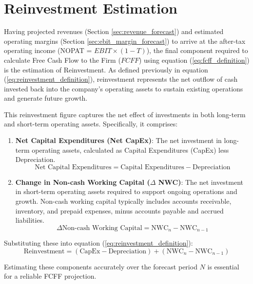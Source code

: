 \section{Reinvestment Estimation} \label{sec:reinvestment_estimation}
Having projected revenues (Section \ref{sec:revenue_forecast}) and estimated operating margins (Section \ref{sec:ebit_margin_forecast}) to arrive at the after-tax operating income (NOPAT = \(EBIT \times (1 - T)\)), the final component required to calculate Free Cash Flow to the Firm (\(FCFF\)) using equation (\ref{eq:fcff_definition}) is the estimation of Reinvestment. As defined previously in equation (\ref{eq:reinvestment_definition}), reinvestment represents the net outflow of cash invested back into the company's operating assets to sustain existing operations and generate future growth.

This reinvestment figure captures the net effect of investments in both long-term and short-term operating assets. Specifically, it comprises:
\begin{enumerate}
    \item \textbf{Net Capital Expenditures (Net CapEx)}: The net investment in long-term operating assets, calculated as Capital Expenditures (CapEx) less Depreciation.
          \[ \text{Net Capital Expenditures} = \text{Capital Expenditures} - \text{Depreciation} \]
    \item \textbf{Change in Non-cash Working Capital (\(\Delta\) NWC)}: The net investment in short-term operating assets required to support ongoing operations and growth. Non-cash working capital typically includes accounts receivable, inventory, and prepaid expenses, minus accounts payable and accrued liabilities.
          \[ \Delta \text{Non-cash Working Capital} = \text{NWC}_n - \text{NWC}_{n-1} \]
\end{enumerate}
Substituting these into equation (\ref{eq:reinvestment_definition}):
\[ \text{Reinvestment} = (\text{CapEx} - \text{Depreciation}) + (\text{NWC}_n - \text{NWC}_{n-1}) \]

Estimating these components accurately over the forecast period \(N\) is essential for a reliable FCFF projection.


